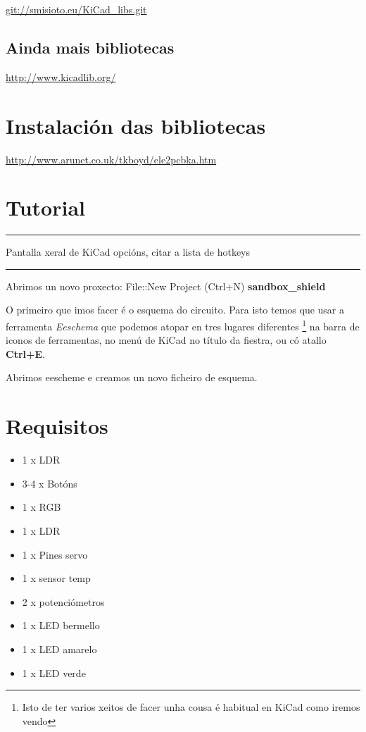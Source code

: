 \url{git://smisioto.eu/KiCad_libs.git}

\subsection{Ainda mais bibliotecas}\label{ainda-mais-bibliotecas}

\url{http://www.kicadlib.org/}

\section{Instalación das
bibliotecas}\label{instalaciuxf3n-das-bibliotecas}

\url{http://www.arunet.co.uk/tkboyd/ele2pcbka.htm}

\section{Tutorial}\label{tutorial}

\begin{center}\rule{0.5\linewidth}{\linethickness}\end{center}

Pantalla xeral de KiCad opcións, citar a lista de hotkeys

\begin{center}\rule{0.5\linewidth}{\linethickness}\end{center}

Abrimos un novo proxecto: File::New Project (Ctrl+N)
\textbf{sandbox\_shield}

O primeiro que imos facer é o esquema do circuito. Para isto temos que
usar a ferramenta \emph{Eeschema} que podemos atopar en tres lugares
diferentes \footnote{Isto de ter varios xeitos de facer unha cousa é
  habitual en KiCad como iremos vendo} na barra de iconos de
ferramentas, no menú de KiCad no título da fiestra, ou có atallo
\textbf{Ctrl+E}.

Abrimos eescheme e creamos un novo ficheiro de esquema.

\section{Requisitos}\label{requisitos}

\begin{itemize}
\itemsep1pt\parskip0pt
\item
  1 x LDR
\item
  3-4 x Botóns
\item
  1 x RGB
\item
  1 x LDR
\item
  1 x Pines servo
\item
  1 x sensor temp
\item
  2 x potenciómetros
\item
  1 x LED bermello
\item
  1 x LED amarelo
\item
  1 x LED verde
\end{itemize}

